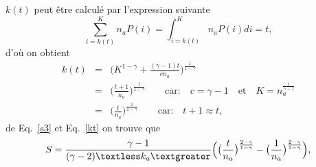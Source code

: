   $k(t)$ peut être calculé par l'expression suivante
  \begin{equation}
  \sum_{i=k(t)}^Kn_aP(i)=\int_{i=k(t)}^Kn_aP(i)di=t,
  \end{equation}
 d'où on obtient
   \begin{eqnarray}
   k(t)&=&\Big(K^{1-\gamma}+\frac{(\gamma-1)t}{cn_a}\Big)^{\frac{1}{1-\gamma}}\nonumber\\
     &=& \Big(\frac{t+1}{n_a}\Big)^{\frac{1}{1-\gamma}} \quad \quad  \text{car:} \quad c=\gamma-1 \quad \text{et} \quad K=n_a^{\frac{1}{\gamma-1}} \nonumber\\
     &=& \Big(\frac{t}{n_a}\Big)^{\frac{1}{1-\gamma}}
     \quad \quad  \text{car:} \quad t+1\approx t,
     \label{kt}
   \end{eqnarray}
 de Eq.~\eqref{s3} et Eq.~\eqref{kt} on trouve que
 \begin{equation}
 S=\frac{\gamma-1}{(\gamma-2)\kma}\Big(\big(\frac{t}{n_a}\big)^{\frac{2-\gamma}{1-\gamma}}-\big(\frac{1}{n_a}\big)^{\frac{2-\gamma}{1-\gamma}}\Big),
 \label{s4}
 \end{equation}
 

